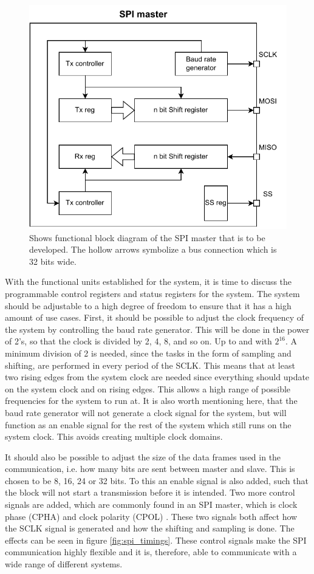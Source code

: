 \documentclass[./dissertation.tex]{subfiles}
\begin{document}
\begin{figure}[H]
    \centering
    \includegraphics[width=0.75\linewidth]{subfiles/imgs/IP_Blocks_Pics/spi_block_dia.drawio.pdf}
    \caption{Shows functional block diagram of the SPI master that is to be developed. The hollow arrows symbolize a bus connection which is 32 bits wide.}
    \label{fig:spi_func_dia}
\end{figure}


With the functional units established for the system, it is time to discuss the programmable control registers and status registers for the system. The system should be adjustable to a high degree of freedom to ensure that it has a high amount of use cases. First, it should be possible to adjust the clock frequency of the system by controlling the baud rate generator. This will be done in the power of 2's, so that the clock is divided by 2, 4, 8, and so on. Up to and with $2^{16}$. A minimum division of 2 is needed, since the tasks in the form of sampling and shifting, are performed in every period of the SCLK. This means that at least two rising edges from the system clock are needed since everything should update on the system clock and on rising edges. This allows a high range of possible frequencies for the system to run at. It is also worth mentioning here, that the baud rate generator will not generate a clock signal for the system, but will function as an enable signal for the rest of the system which still runs on the system clock. This avoids creating multiple clock domains. 

It should also be possible to adjust the size of the data frames used in the communication, i.e. how many bits are sent between master and slave. This is chosen to be 8, 16, 24 or 32 bits. To this an enable signal is also added, such that the block will not start a transmission before it is intended. Two more control signals are added, which are commonly found in an SPI master, which is clock phase (CPHA) and clock polarity (CPOL) \cite{SPIManualSTM}. These two signals both affect how the SCLK signal is generated and how the shifting and sampling is done. The effects can be seen in figure \ref{fig:spi_timings}. These control signals make the SPI communication highly flexible and it is, therefore, able to communicate with a wide range of different systems.
\end{document}
